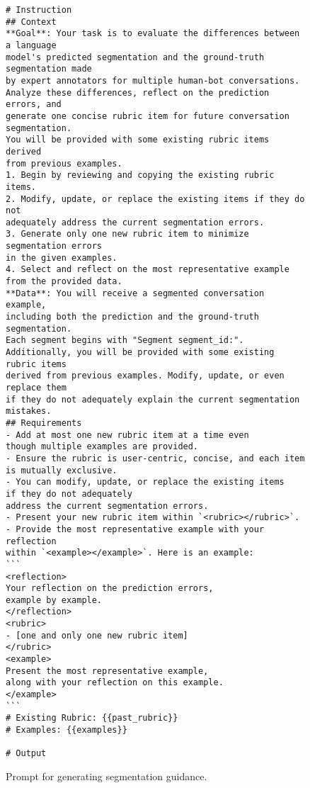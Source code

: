 \begin{figure}[htb]
\small
\begin{tcolorbox}[left=3pt,right=3pt,top=3pt,bottom=3pt,title=Prompt for Generating the Segmentation Guidance]
\begin{verbatim}
# Instruction
## Context
**Goal**: Your task is to evaluate the differences between a language 
model's predicted segmentation and the ground-truth segmentation made 
by expert annotators for multiple human-bot conversations. 
Analyze these differences, reflect on the prediction errors, and 
generate one concise rubric item for future conversation segmentation. 
You will be provided with some existing rubric items derived 
from previous examples. 
1. Begin by reviewing and copying the existing rubric items.
2. Modify, update, or replace the existing items if they do not 
adequately address the current segmentation errors.
3. Generate only one new rubric item to minimize segmentation errors 
in the given examples.
4. Select and reflect on the most representative example 
from the provided data.
**Data**: You will receive a segmented conversation example, 
including both the prediction and the ground-truth segmentation.
Each segment begins with "Segment segment_id:". 
Additionally, you will be provided with some existing rubric items 
derived from previous examples. Modify, update, or even replace them 
if they do not adequately explain the current segmentation mistakes.
## Requirements
- Add at most one new rubric item at a time even 
though multiple examples are provided.
- Ensure the rubric is user-centric, concise, and each item 
is mutually exclusive.
- You can modify, update, or replace the existing items 
if they do not adequately 
address the current segmentation errors.
- Present your new rubric item within `<rubric></rubric>`. 
- Provide the most representative example with your reflection 
within `<example></example>`. Here is an example:
```
<reflection>
Your reflection on the prediction errors, 
example by example.
</reflection>
<rubric>
- [one and only one new rubric item]
</rubric>
<example>
Present the most representative example, 
along with your reflection on this example. 
</example>
```
# Existing Rubric: {{past_rubric}}
# Examples: {{examples}}

# Output
\end{verbatim}
\end{tcolorbox}
\caption{Prompt for generating segmentation guidance.}
\label{fig: prompt4rubric}
\end{figure}